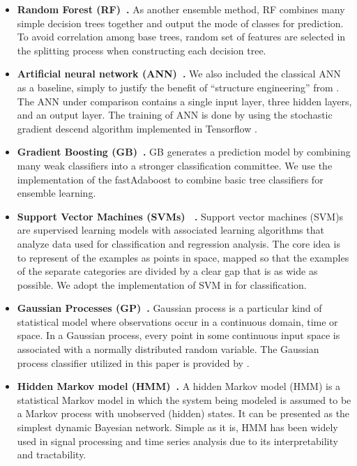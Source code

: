 \begin{itemize}
  \item
  \textbf{Random Forest (RF)~\cite{bib:liaw2002classification}.}
  As another ensemble method, RF combines many simple decision trees together and output the mode of classes for prediction.
  To avoid correlation among base trees, random set of features are selected in the splitting process when constructing each decision tree.

  \item
  \textbf{Artificial neural network (ANN)~\cite{bib:wang2003artificial}.}
  We also included the classical ANN as a baseline, simply to justify the benefit of ``structure engineering'' from \modelname. The ANN under comparison contains a single input layer, three hidden layers, and an output layer. The training of ANN is done by using the stochastic gradient descend algorithm implemented in Tensorflow \cite{bib:Tensorflow}.

  \item
  \textbf{Gradient Boosting (GB)~\cite{bib:friedman2002stochastic}.}
  GB generates a prediction model by combining many weak classifiers into a stronger classification committee.
  We use the implementation of the fastAdaboost \cite{bib:fastAdaboost} to combine basic tree classifiers for ensemble learning.

  \item
  \textbf{Support Vector Machines  (SVMs)~\cite{bib:wang2005support} .}
  Support vector machines (SVM)s are supervised learning models with associated learning algorithms that analyze data used for classification and regression analysis.  The core idea is to represent of the examples as points in space, mapped so that the examples of the separate categories are divided by a clear gap that is as wide as possible. We adopt the implementation of SVM in \cite{bib:scikit-learn} for classification.

 \item
 \textbf{Gaussian Processes (GP)~\cite{bib:rasmussen2006gaussian}.}
  Gaussian process is a particular kind of statistical model where observations occur in a continuous domain, \eg time or space. In a Gaussian process, every point in some continuous input space is associated with a normally distributed random variable. The Gaussian process classifier utilized in this paper is provided by \cite{bib:scikit-learn}.

\item
\textbf{Hidden Markov model (HMM)~\cite{bib:rabiner1986introduction}.}
A hidden Markov model (HMM) is a statistical Markov model in which the system being modeled is assumed to be a Markov process with unobserved (hidden) states. It can be presented as the simplest dynamic Bayesian network. Simple as it is, HMM has been widely used in signal processing and time series analysis due to its interpretability and tractability.

\end{itemize}


